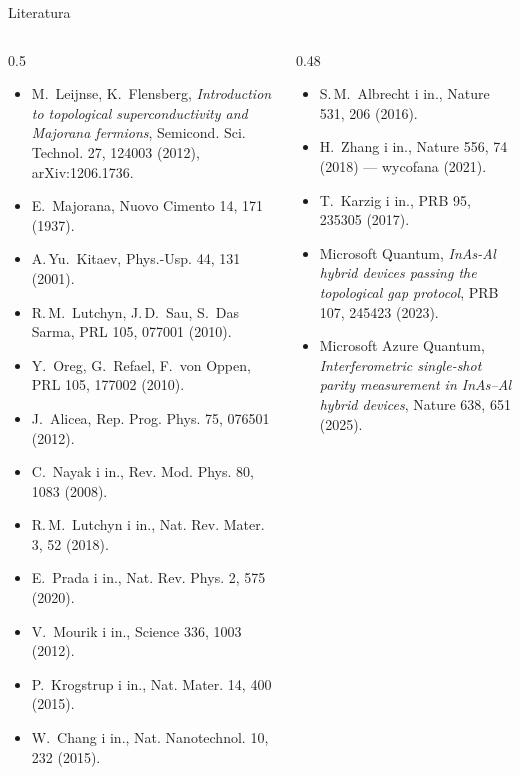 \documentclass[aspectratio=169,10pt]{beamer}
\begin{document}
\begin{frame}{Literatura}
  \scriptsize
  \begin{columns}[T]
    \begin{column}{0.5\textwidth}
    \begin{itemize}\setlength{\itemsep}{1pt}
      \item[{[LF12]}] M.~Leijnse, K.~Flensberg, \emph{Introduction to topological superconductivity and Majorana fermions}, Semicond. Sci. Technol. 27, 124003 (2012), arXiv:1206.1736.
      \item[] E.~Majorana, Nuovo Cimento 14, 171 (1937).
      \item[] A.\,Yu.~Kitaev, Phys.-Usp. 44, 131 (2001).
      \item[] R.\,M.~Lutchyn, J.\,D.~Sau, S.~Das Sarma, PRL 105, 077001 (2010).
      \item[] Y.~Oreg, G.~Refael, F.~von Oppen, PRL 105, 177002 (2010).
      \item[] J.~Alicea, Rep. Prog. Phys. 75, 076501 (2012).
      \item[] C.~Nayak i in., Rev. Mod. Phys. 80, 1083 (2008).
      \item[] R.\,M.~Lutchyn i in., Nat. Rev. Mater. 3, 52 (2018).
      \item[] E.~Prada i in., Nat. Rev. Phys. 2, 575 (2020).
      \item[] V.~Mourik i in., Science 336, 1003 (2012).
      \item[] P.~Krogstrup i in., Nat. Mater. 14, 400 (2015).
      \item[] W.~Chang i in., Nat. Nanotechnol. 10, 232 (2015).
    \end{itemize}
    \end{column}
    \begin{column}{0.48\textwidth}
    \begin{itemize}\setlength{\itemsep}{1pt}
      \item[] S.\,M.~Albrecht i in., Nature 531, 206 (2016).
      \item[] H.~Zhang i in., Nature 556, 74 (2018) — wycofana (2021).
      \item[] T.~Karzig i in., PRB 95, 235305 (2017).
      \item[] Microsoft Quantum, \emph{InAs-Al hybrid devices passing the topological gap protocol}, PRB 107, 245423 (2023).
      \item[] Microsoft Azure Quantum, \emph{Interferometric single-shot parity measurement in InAs–Al hybrid devices}, Nature 638, 651 (2025).

\end{itemize}
\end{column}
\end{columns}
\end{frame}
\end{document}
